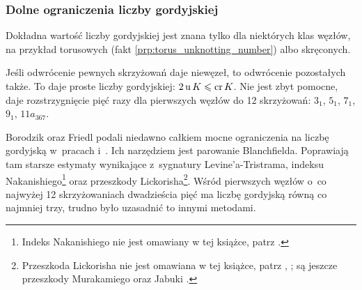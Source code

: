 
\subsubsection{Dolne ograniczenia liczby gordyjskiej}
Dokładna wartość liczby gordyjskiej jest znana tylko dla niektórych klas węzłów, na przykład torusowych (fakt \ref{prp:torus_unknotting_number}) albo skręconych.
%
%

Jeśli odwrócenie pewnych skrzyżowań daje niewęzeł, to odwrócenie pozostałych także.
To daje proste liczby gordyjskiej: $2 \operatorname{u} K \leqslant \operatorname{cr} K$.
Nie jest zbyt pomocne, daje rozstrzygnięcie pięć razy dla pierwszych węzłów do 12 skrzyżowań: $3_{1}$, $5_{1}$, $7_{1}$, $9_{1}$, $11a_{367}$.

Borodzik oraz Friedl podali niedawno całkiem mocne ograniczenia na liczbę gordyjską w~pracach \cite{borodzik2014} i~\cite{borodzik2015}.
%
%
Ich narzędziem jest parowanie Blanchfielda.
%
Poprawiają tam starsze estymaty wynikające z~sygnatury Levine'a-Tristrama, indeksu Nakanishiego\footnote{Indeks Nakanishiego nie jest omawiany w tej książce, patrz \cite{nakanishi1981}.} oraz przeszkody Lickorisha\footnote{Przeszkoda Lickorisha nie jest omawiana w tej książce, patrz \cite{cochran1986}, \cite{lickorish1985}; są jeszcze przeszkody Murakamiego \cite{murakami1990} oraz Jabuki \cite{jabuka2010}.}.
%
%
%
Wśród pierwszych węzłów o~co najwyżej 12 skrzyżowaniach dwadzieścia pięć ma liczbę gordyjską równą co najmniej trzy, trudno było uzasadnić to innymi metodami.

